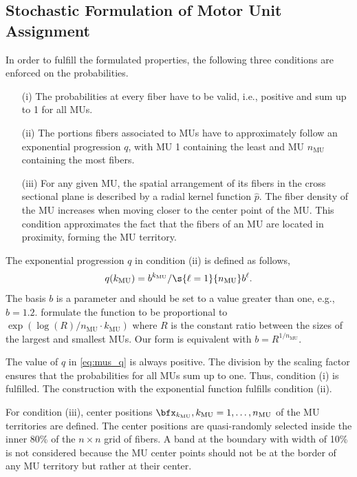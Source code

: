 \subsection{Stochastic Formulation of Motor Unit Assignment}\label{sec:stochastic_formulation_and_algorithm}

In order to fulfill the formulated properties, the following three conditions are enforced on the probabilities. 
\begin{itemize}
\item[(i)] The probabilities at every fiber  have to be valid, i.e., positive and sum up to 1 for all MUs.
\item[(ii)] The portions fibers associated to MUs have to approximately follow an exponential progression $q$, with MU 1 containing the least and MU $n_\text{MU}$ containing the most fibers.
\item[(iii)] For any given MU, the spatial arrangement of its fibers in the cross sectional plane is described by a radial kernel function $\hat{p}$. The fiber density of the MU increases when moving closer to the center point of the MU. This condition approximates the fact that the fibers of an MU are located in proximity, forming the MU territory.
\end{itemize}

The exponential progression $q$ in condition (ii) is defined as follows,
%
\begin{align}\label{eq:mus_q}
  q(k_\text{MU}) = b^{k_\text{MU}} / \s{\ell=1}{n_\text{MU}} b^\ell.
\end{align}
%
%
% 
The basis $b$ is a parameter and should be set to a value greater than one, e.g., $b=\num{1.2}$. \Cite{Enoka2001} formulate the function to be proportional to $\exp(\log(R)/n_\text{MU}\cdot k_\text{MU})$ where $R$ is the constant ratio between the sizes of the largest and smallest MUs. Our form is equivalent with $b = R^{1/n_\text{MU}}$.

The value of $q$ in \cref{eq:mus_q} is always positive. The division by the scaling factor ensures that the probabilities for all MUs sum up to one. Thus, condition (i) is fulfilled. The construction with the exponential function fulfills condition (ii).

For condition (iii), center positions $\bfx_{k_\text{MU}}, k_\text{MU}=1, \dots, n_\text{MU}$ of the MU territories are defined. 
The center positions are quasi-randomly selected inside the inner 80\% of the $n \times n$ grid of fibers. A band at the boundary with width of 10\% is not considered because the MU center points should not be at the border of any MU territory but rather at their center.

